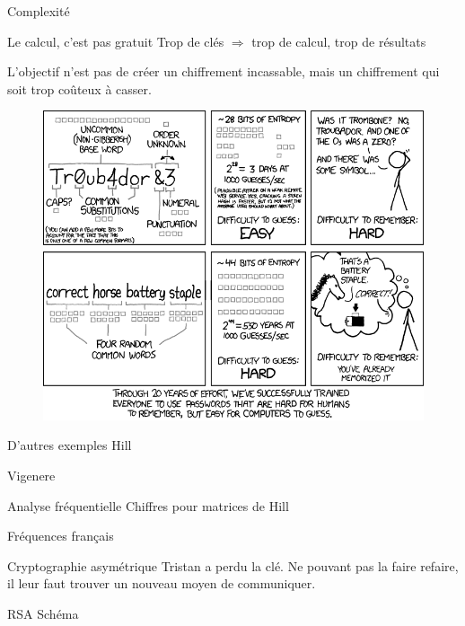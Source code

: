 \documentclass{beamer}
\begin{document}
\begin{frame}{Complexité}

  \begin{alertblock}{Le calcul, c'est pas gratuit}
    Trop de clés $\Rightarrow$ trop de calcul, trop de résultats
\end{alertblock}
  L'objectif n'est pas de créer un chiffrement incassable, mais un chiffrement qui soit trop coûteux à casser.

  
  \begin{figure}
  \centering
  \includegraphics[scale = 0.3]{xkcdpassword_strength.png}
  \end{figure}
  \end{frame}

\begin{frame}{D'autres exemples}
  Hill

  Vigenere
  \end{frame}

\begin{frame}{Analyse fréquentielle}
  Chiffres pour matrices de Hill

  Fréquences français
  \end{frame}


\begin{frame}{Cryptographie asymétrique}
  Tristan a perdu la clé. Ne pouvant pas la faire refaire, il leur faut trouver un nouveau moyen de communiquer.
\end{frame}

\begin{frame}{RSA}
  Schéma
  \end{frame}
\end{document}
